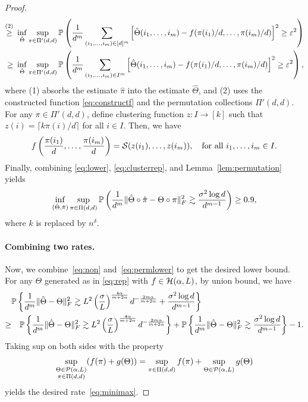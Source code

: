 \documentclass[12pt]{article}
\theoremstyle{definition}
\begin{document}
\begin{proof}
\begin{align}
\stackrel{(2)}{\geq}& \ \inf_{\hat  \Theta}\sup_{\pi\in\Pi'(d,d)}\mathbb{P}\left({1\over d^m}\sum_{(i_1,\ldots,i_m)\in[d]^m}\left[\hat \Theta(i_1,\ldots,i_m)-f(\pi(i_1)/d,\ldots,\pi(i_m)/d)\right]^2\geq \varepsilon^2\right)\notag \\
\geq & \ \inf_{\hat  \Theta}\sup_{\pi\in \Pi'(d,d)}\mathbb{P}\left({1\over d^m}\sum_{(i_1,\ldots,i_m)\in I^m}\left[\hat \Theta(i_1,\ldots,i_m)-f(\pi(i_1)/d,\ldots,\pi(i_m)/d)\right]^2\geq \varepsilon^2\right),
\end{align}
where (1) absorbs the estimate $\hat \pi$ into the estimate $\hat \Theta$, and (2) uses the constructed function \eqref{eq:constructf} and the permutation collections $\Pi'(d,d)$. For any $\pi\in\Pi'(d,d)$, define clustering function $z\colon I\rightarrow[k]$ such that $z(i) = \lceil k\pi(i)/d\rceil$ for all $i\in I$. Then, we have 
\begin{align}\label{eq:clusterrep}
    f\left({\pi(i_1)\over d},\ldots,{\pi(i_m)\over d}\right) = \mathcal{S}(z(i_1),\ldots,z(i_m)),\quad\text{for all } i_1,\ldots,i_m\in I.
\end{align}
Finally, combining \eqref{eq:lower}, \eqref{eq:clusterrep}, and Lemma~\ref{lem:permutation} yields 
\begin{align}\label{eq:permlower}
\inf_{(\hat \Theta,\hat \pi)}\sup_{\pi\in \Pi(d,d)}\mathbb{P}\left({1\over d^m}\lVert\hat \Theta\circ \hat \pi-\Theta\circ \pi\rVert_F^2\gtrsim \frac{\sigma^2\log d}{d^{m-1}}\right) \geq 0.9,
\end{align}
where $k$ is replaced by $n^\delta$.

\paragraph{Combining two rates.} Now, we combine~\eqref{eq:non} and~\eqref{eq:permlower} to get the desired lower bound. For any $\Theta$  generated as in  \eqref{eq:rep} with $f\in\mathcal{H}(\alpha,L)$, by union bound, we have
\begin{align}
&\mathbb{P}\left\{ {1\over d^m}\lVert\hat \Theta- \Theta\rVert_F^2\gtrsim L^2\left(\sigma\over L\right)^{4\alpha\over m+2\alpha}d^{-{2m\alpha\over m+2\alpha}}+\frac{\sigma^2\log d}{d^{m-1}}\right\}\\
\geq &\quad \mathbb{P}\left\{ {1\over d^m}\lVert\hat \Theta-\Theta\rVert_F^2\gtrsim L^2\left(\sigma\over L\right)^{4\alpha\over m+2\alpha}d^{-{2m\alpha\over m+2\alpha}}\right\} +\mathbb{P}\left\{ {1\over d^m}\lVert\hat \Theta- \Theta\rVert_F^2\gtrsim \frac{\sigma^2\log d}{d^{m-1}}\right\}-1.
\end{align}
Taking sup on both sides with the property
\[
\sup_{\substack{\Theta\in \mathcal{P}(\alpha,L)\\\pi\in \Pi(d,d)}}(f(\pi)+g(\Theta))=\sup_{\pi\in \Pi(d,d)}f(\pi)+\sup_{\Theta\in \mathcal{P}(\alpha,L)}g(\Theta)
\]
yields the desired rate~\eqref{eq:minimax}. 
\end{proof}
\end{document}
